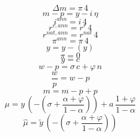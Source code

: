 \documentclass[12pt]{article}
\newcommand{\1}{\mathbbm 1}
\begin{document}
\begin{equation*}
	{{\Delta m}}={{\pi}}\, 4
\end{equation*}
\begin{equation*}
	{{m-p}}={{y}}-{{i}}\, {{\eta}}
\end{equation*}
\begin{equation*}
	{{i^{ann}}}={{i}}\, 4
\end{equation*}
\begin{equation*}
	{{r^{r,ann}}}={{r^r}}\, 4
\end{equation*}
\begin{equation*}
	{{r^{nat,ann}}}={{r^{nat}}}\, 4
\end{equation*}
\begin{equation*}
	{{\pi^{ann}}}={{\pi}}\, 4
\end{equation*}
\begin{equation*}
	{{\hat y}}={{y}}-({{y}})
\end{equation*}
\begin{equation*}
	{{\pi}}=0
\end{equation*}
\begin{equation*}
	{{y}}={{c}}
\end{equation*}
\begin{equation*}
	{{w}}-{{p}}={{\sigma}}\, {{c}}+{{\varphi}}\, {{n}}
\end{equation*}
\begin{equation*}
	{{\frac{w}{p}}}={{w}}-{{p}}
\end{equation*}
\begin{equation*}
	{{m}}={{m-p}}+{{p}}
\end{equation*}
\begin{equation*}
	{{\mu}}={{y}}\, \left(-\left({{\sigma}}+\frac{{{\alpha}}+{{\varphi}}}{1-{{\alpha}}}\right)\right)+{{a}}\, \frac{1+{{\varphi}}}{1-{{\alpha}}}
\end{equation*}
\begin{equation*}
	{{\hat \mu}}={{\tilde y}}\, \left(-\left({{\sigma}}+\frac{{{\alpha}}+{{\varphi}}}{1-{{\alpha}}}\right)\right)
\end{equation*}
		
	
	
	\newpage
	\singlespacing
	\newpage
	
	
	\clearpage
	
	
	
	
	
	
	
	
	
\end{document}
